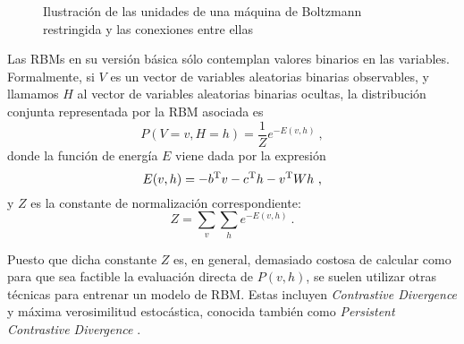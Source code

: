 \begin{figure}[hbtp]
  \centering
  
  \caption[Máquina de Boltzmann restringida]{Ilustración de las unidades de una máquina de Boltzmann restringida y las conexiones entre ellas}
  \label{fig:rbm}
\end{figure}

Las RBMs en su versión básica sólo contemplan valores binarios en las variables. Formalmente, si $V$ es un vector de variables aleatorias binarias observables, y llamamos $H$ al vector de variables aleatorias binarias ocultas, la distribución conjunta representada por la RBM asociada es
\[
  P(V=v,H=h)=\frac 1 Z e^{-E(v,h)}~,
\]
donde la función de energía $E$ viene dada por la expresión
\[
  E(v,h)=-b^{\mathrm{T}} v -c^{\mathrm{T}} h - v^{\mathrm{T}} W h~,
\]
y $Z$ es la constante de normalización correspondiente:
\[
Z=\sum_{v}\sum_{h}e^{-E(v,h)}~.
\]

Puesto que dicha constante $Z$ es, en general, demasiado costosa de calcular como para que sea factible la evaluación directa de $P(v, h)$, se suelen utilizar otras técnicas para entrenar un modelo de RBM. Estas incluyen \textit{Contrastive Divergence} \autocite{hinton2002cd} y máxima verosimilitud estocástica, conocida también como \textit{Persistent Contrastive Divergence} \autocite{tieleman2008pcd}.

